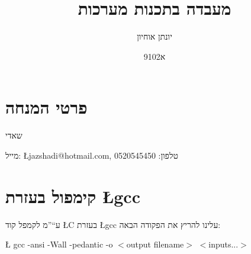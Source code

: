 \documentclass[11pt, oneside]{book}
\title{מעבדה בתכנות מערכות}
\author{יונתן אוחיון}
\date{9102א}
\begin{document}
\maketitle

\section*{פרטי המנחה}
שאדי

מייל: \L{jazshadi@hotmail.com}, טלפון: 0520545450

\section*{קימפול בעזרת \L{gcc}}
ע``''מ לקמפל קוד \L{C} בעזרת \L{gcc} עלינו להריץ את הפקודה הבאה:
\begin{center}
\L{
	gcc -ansi -Wall -pedantic -o $<$output filename$>$ $<$inputs...$>$
}
\end{center}
\end{document}
